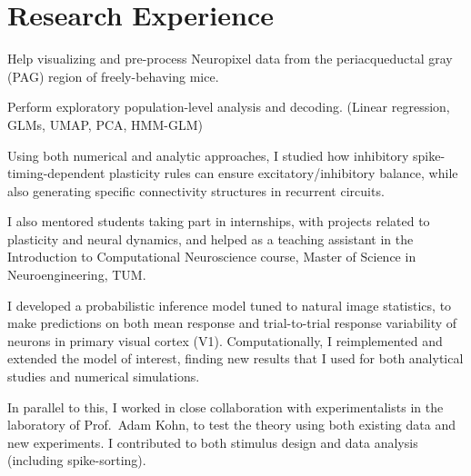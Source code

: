 \documentclass{muratcan_cv}
\begin{document}
{\section{Research Experience}{%
%
\begin{explanationitems}
  \item Help visualizing and pre-process Neuropixel data from the periacqueductal gray (PAG) region of freely-behaving mice.
  \item Perform exploratory population-level analysis and decoding. (Linear regression, GLMs, UMAP, PCA, HMM-GLM)
\end{explanationitems}
\begin{explanationitems}
  \item Using both numerical and analytic approaches, I studied how inhibitory spike-timing-dependent plasticity rules can ensure excitatory/inhibitory balance, while also generating specific connectivity structures in recurrent circuits.
  \item I also mentored students taking part in internships, with projects related to plasticity and neural dynamics, and helped as a teaching assistant in the Introduction to Computational Neuroscience course, Master of Science in Neuroengineering, TUM.
\end{explanationitems}
 \begin{explanationitems}
   \item I developed a probabilistic inference model tuned to natural image statistics, to make predictions on both mean response and trial-to-trial response variability of neurons in primary visual cortex (V1). Computationally, I reimplemented and extended the model of interest, finding new results that I used for both analytical studies and numerical simulations.
   \item In parallel to this, I worked in close collaboration with experimentalists in the laboratory of Prof.~Adam Kohn, to test the theory using both existing data and new experiments. I contributed to both stimulus design and data analysis (including spike-sorting).
\end{explanationitems}

}}
\end{document}

